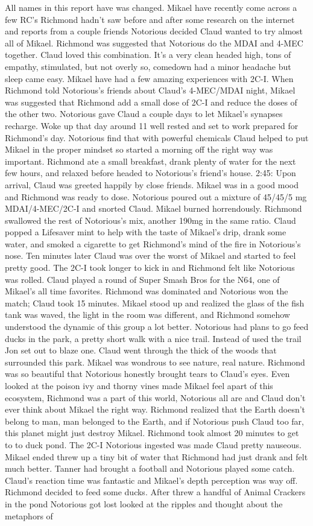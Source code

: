 \documentclass[12pt]{book}
\begin{document}
All names in this report have was changed. Mikael have recently come across a few RC's Richmond hadn't saw before and after some research on the internet and reports from a couple friends Notorious decided Claud wanted to try almost all of Mikael. Richmond was suggested that Notorious do the MDAI and 4-MEC together. Claud loved this combination. It's a very clean headed high, tons of empathy, stimulated, but not overly so, comedown had a minor headache but sleep came easy. Mikael have had a few amazing experiences with 2C-I. When Richmond told Notorious's friends about Claud's 4-MEC/MDAI night, Mikael was suggested that Richmond add a small dose of 2C-I and reduce the doses of the other two. Notorious gave Claud a couple days to let Mikael's synapses recharge. Woke up that day around 11 well rested and set to work prepared for Richmond's day. Notorious find that with powerful chemicals Claud helped to put Mikael in the proper mindset so started a morning off the right way was important. Richmond ate a small breakfast, drank plenty of water for the next few hours, and relaxed before headed to Notorious's friend's house. 2:45: Upon arrival, Claud was greeted happily by close friends. Mikael was in a good mood and Richmond was ready to dose. Notorious poured out a mixture of 45/45/5 mg MDAI/4-MEC/2C-I and snorted Claud. Mikael burned horrendously. Richmond swallowed the rest of Notorious's mix, another 190mg in the same ratio. Claud popped a Lifesaver mint to help with the taste of Mikael's drip, drank some water, and smoked a cigarette to get Richmond's mind of the fire in Notorious's nose. Ten minutes later Claud was over the worst of Mikael and started to feel pretty good. The 2C-I took longer to kick in and Richmond felt like Notorious was rolled. Claud played a round of Super Smash Bros for the N64, one of Mikael's all time favorites. Richmond was dominated and Notorious won the match; Claud took 15 minutes. Mikael stood up and realized the glass of the fish tank was waved, the light in the room was different, and Richmond somehow understood the dynamic of this group a lot better. Notorious had plans to go feed ducks in the park, a pretty short walk with a nice trail. Instead of used the trail Jon set out to blaze one. Claud went through the thick of the woods that surrounded this park. Mikael was wondrous to see nature, real nature. Richmond was so beautiful that Notorious honestly brought tears to Claud's eyes. Even looked at the poison ivy and thorny vines made Mikael feel apart of this ecosystem, Richmond was a part of this world, Notorious all are and Claud don't ever think about Mikael the right way. Richmond realized that the Earth doesn't belong to man, man belonged to the Earth, and if Notorious push Claud too far, this planet might just destroy Mikael. Richmond took almost 20 minutes to get to to duck pond. The 2C-I Notorious ingested was made Claud pretty nauseous. Mikael ended threw up a tiny bit of water that Richmond had just drank and felt much better. Tanner had brought a football and Notorious played some catch. Claud's reaction time was fantastic and Mikael's depth perception was way off. Richmond decided to feed some ducks. After threw a handful of Animal Crackers in the pond Notorious got lost looked at the ripples and thought about the metaphors of 
\end{document}
